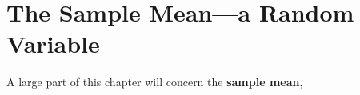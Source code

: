 % 
% 
% 
% 
% 
% 
% 
% 
% 
% 
% 
% 
% 
% 
% 


\section{The Sample Mean---a Random Variable}

A large part of this chapter will concern the {\bf sample mean},

